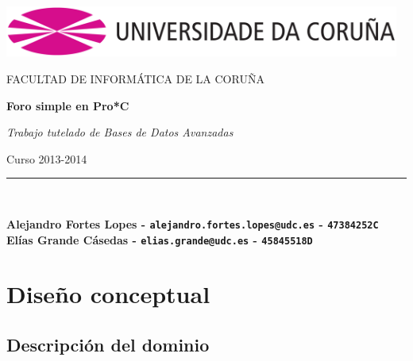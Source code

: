 \documentclass[12pt, a4paper, titlepage]{article}
\begin{document}
\begin{titlepage}

\begin{center}

\includegraphics[width=13cm]{./img/logo_UDC.png}
\vspace*{0.5in}

FACULTAD DE INFORMÁTICA DE LA CORUÑA\\
\vspace*{2.5in}

\begin{Large}
\textbf{Foro simple en Pro*C} \\
\end{Large}
\vspace*{0.1in}

\begin{large}
\textit{Trabajo tutelado de Bases de Datos Avanzadas} \\
\end{large}
\vspace*{0.4in}

\begin{large}
Curso 2013-2014
\end{large}
\vspace*{3.4in}


\rule{80mm}{0.1mm}\\
\vspace*{0.25in}


\textbf{Alejandro Fortes Lopes - \texttt{alejandro.fortes.lopes@udc.es} - \texttt{47384252C}}\\
\textbf{Elías Grande Cásedas - \texttt{elias.grande@udc.es} - \texttt{45845518D}}\\

\end{center}

\end{titlepage}

\tableofcontents

\pagestyle{fancy}

\pagebreak
\section{Diseño conceptual}

\subsection{Descripción del dominio}
\end{document}
